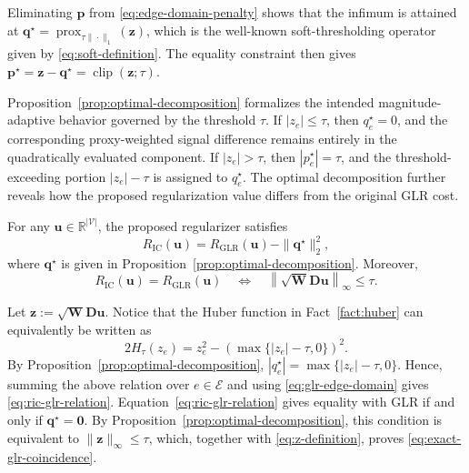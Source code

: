 \begin{IEEEproof}
Eliminating $\mathbf{p}$ from \eqref{eq:edge-domain-penalty} shows that the infimum is attained at $\mathbf{q}^{\star}=\operatorname{prox}_{\tau\|\cdot\|_1}(\mathbf{z})$, which is the well-known soft-thresholding operator given by \eqref{eq:soft-definition}.
The equality constraint then gives $\mathbf{p}^{\star}=\mathbf{z}-\mathbf{q}^{\star}=\operatorname{clip}(\mathbf{z};\tau)$.
\end{IEEEproof}

Proposition~\ref{prop:optimal-decomposition} formalizes the intended magnitude-adaptive behavior governed by the threshold $\tau$.
If $|z_e|\leq\tau$, then $q_e^{\star}=0$, and the corresponding proxy-weighted signal difference remains entirely in the quadratically evaluated component.
If $|z_e|>\tau$, then $|p_e^{\star}|=\tau$, and the threshold-exceeding portion $|z_e|-\tau$ is assigned to $q_e^{\star}$.
The optimal decomposition further reveals how the proposed regularization value differs from the original GLR cost.

\begin{proposition}
\label{prop:relation-to-glr}
For any $\mathbf{u}\in\mathbb{R}^{|\mathcal{V}|}$, the proposed regularizer satisfies
\begin{equation}
R_{\mathrm{IC}}(\mathbf{u})
=
R_{\mathrm{GLR}}(\mathbf{u})
-
\|\mathbf{q}^{\star}\|_2^2,
\label{eq:ric-glr-relation}
\end{equation}
where $\mathbf{q}^{\star}$ is given in Proposition~\ref{prop:optimal-decomposition}.
Moreover,
\begin{equation}
R_{\mathrm{IC}}(\mathbf{u})
=
R_{\mathrm{GLR}}(\mathbf{u})
\quad\Longleftrightarrow\quad
\left\|
\sqrt{\mathbf{W}}\mathbf{D}\mathbf{u}
\right\|_{\infty}
\leq
\tau.
\label{eq:exact-glr-coincidence}
\end{equation}
\end{proposition}

\begin{IEEEproof}
Let $\mathbf{z}:=\sqrt{\mathbf{W}}\mathbf{D}\mathbf{u}$.
Notice that the Huber function in Fact~\ref{fact:huber} can equivalently be written as
\[
2H_\tau(z_e)
=
z_e^2
-
\left(
\max\{|z_e|-\tau,0\}
\right)^2.
\]
By Proposition~\ref{prop:optimal-decomposition},
$|q_e^\star|=\max\{|z_e|-\tau,0\}$.
Hence, summing the above relation over $e\in\mathcal{E}$ and using \eqref{eq:glr-edge-domain} gives \eqref{eq:ric-glr-relation}.
Equation~\eqref{eq:ric-glr-relation} gives equality with GLR if and only if $\mathbf{q}^{\star}=\mathbf{0}$.
By Proposition~\ref{prop:optimal-decomposition}, this condition is equivalent to $\|\mathbf{z}\|_\infty\leq\tau$, which, together with \eqref{eq:z-definition}, proves \eqref{eq:exact-glr-coincidence}.
\end{IEEEproof}

